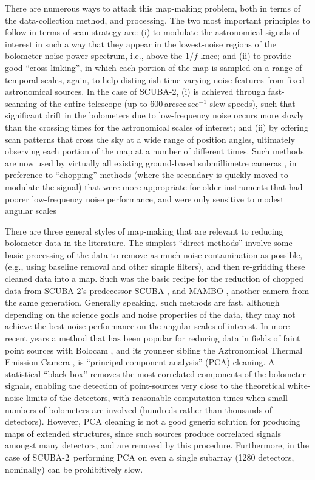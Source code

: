 \documentclass[useAMS,usenatbib,nofootinbib]{mn2e}
\newcommand{\scuba}{SCUBA-2}
\begin{document}
There are numerous ways to attack this map-making problem, both in
terms of the data-collection method, and processing. The two most
important principles to follow in terms of scan strategy are: (i) to
modulate the astronomical signals of interest in such a way that they
appear in the lowest-noise regions of the bolometer noise power
spectrum, i.e., above the $1/f$ knee; and (ii) to provide good
``cross-linking'', in which each portion of the map is sampled on a
range of temporal scales, again, to help distinguish time-varying
noise features from fixed astronomical sources. In the case of \scuba,
(i) is achieved through fast-scanning of the entire telescope (up to
600\,arcsec\,sec$^{-1}$ slew speeds), such that significant drift in
the bolometers due to low-frequency noise occurs more slowly than the
crossing times for the astronomical scales of interest; and (ii) by
offering scan patterns that cross the sky at a wide range of position
angles, ultimately observing each portion of the map at a number of
different times. Such methods are now used by virtually all existing
ground-based submillimetre cameras
\citep[e.g.,][]{glenn1998,weferling2002,wilson2008,kovacs2008b}, in
preference to ``chopping'' methods (where the secondary is quickly
moved to modulate the signal) that were more appropriate for older
instruments that had poorer low-frequency noise performance, and were
only sensitive to modest angular scales

There are three general styles of map-making that are relevant to
reducing bolometer data in the literature. The simplest ``direct
methods'' involve some basic processing of the data to remove as much
noise contamination as possible, (e.g., using baseline removal and
other simple filters), and then re-gridding these cleaned data into a
map. Such was the basic recipe for the reduction of chopped data from
SCUBA-2's predecessor SCUBA
\citep{1998ASPC..145..216J,2000ASPC..216..559J}, and MAMBO
\citep[e.g.,][]{omont2001}, another camera from the same
generation. Generally speaking, such methods are fast, although
depending on the science goals and noise properties of the data, they
may not achieve the best noise performance on the angular scales of
interest. In more recent years a method that has been popular for
reducing data in fields of faint point sources with Bolocam
\citep[e.g.,][]{laurent2005}, and its younger sibling the Aztronomical
Thermal Emission Camera \citep[AzTEC, e.g.,][]{scott2008}, is
``principal component analysis'' (PCA) cleaning. A statistical
``black-box'' removes the most correlated components of the bolometer
signals, enabling the detection of point-sources very close to the
theoretical white-noise limits of the detectors, with reasonable
computation times when small numbers of bolometers are involved
(hundreds rather than thousands of detectors). However, PCA cleaning
is not a good generic solution for producing maps of extended
structures, since such sources produce correlated signals amongst many
detectors, and are removed by this procedure. Furthermore, in the case
of \scuba\, performing PCA on even a single subarray (1280 detectors,
nominally) can be prohibitively slow.
\end{document}

